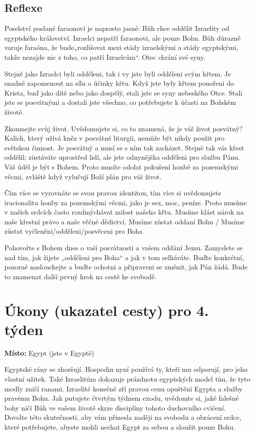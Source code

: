 \documentclass[11pt]{article}
\begin{document}
\subsection*{Reflexe}

Poselství poslané faraonovi je naprosto jasné: Bůh chce oddělit Izraelity od egyptského království. Izraelci nepatří
faraonovi, ale pouze Bohu. Bůh důrazně varuje faraóna, že bude„rozlišovat mezi stády izraelskými a stády
egyptskými, takže nezajde nic z toho, co patří Izraelcům“. Otec chrání své syny.

Stejně jako Izraelci byli odděleni, tak i vy jste byli odděleni svým křtem. Je snadné zapomenout na sílu a účinky
křtu. Když jste byly křtem ponořeni do Krista, buď jako dítě nebo jako dospělý, stali jste se syny nebeského Otce.
Stali jste se posvátnými a dostali jste všechno, co potřebujete k účasti na Božském životě.

Zkoumejte svůj život. Uvědomujete si, co to znamená, že je váš život posvátný? Kalich, který užívá kněz v
posvátné liturgii, nemůže být nikdy použit pro světskou činnost. Je posvátný a musí se s ním tak zacházet. Stejně
tak vás křest oddělil; zůstáváte uprostřed lidí, ale jste odnynějška odděleni pro službu Pánu. Váš úděl je být s
Bohem. Proto musíte odolat pokušení honbě za pozemskými věcmi, zvláště když vylučují Boží plán pro váš život.

Čím více se vyrovnáte se svou pravou identitou, tím více si uvědomujete iracionalitu honby za pozemskými věcmi,
jako je sex, moc, peníze. Proto musíme v našich srdcích často rozdmýchávat milost našeho křtu. Musíme klást
nárok na naše křestní právo a naše věčné dědictví. Musíme zůstat oddaní Bohu / Musíme zůstat
vyčleněni/odděleni/posvěceni pro Boha

Pohovořte s Bohem dnes o vaší posvátnosti a vašem oddání Jemu. Zamyslete se nad tím, jak žijete „odděleni pro
Boha“ a jak v tom selháváte. Buďte konkrétní, pozorně naslouchejte a buďte ochotni a připraveni se změnit, jak
Pán žádá. Bude to znamenat další pevný krok na cestě ke svobodě.

\newpage
\section*{Úkony (ukazatel cesty) pro 4. týden}

\textbf{Místo:} Egypt (jste v Egyptě)

Egyptské rány se zhoršují. Hospodin nyní používá ty, kteří mu odporují, pro jeho vlastní užitek. Také
Izraelitům dokazuje prázdnotu egyptských model tím, že tyto modly zničí ranami. Izraelité konečně zří
pravou cenu opuštění Egypta a služby pravému Bohu. Jak putujete čtvrtým týdnem exodu, uvědomte si,
jaké falešné bohy ničí Bůh ve vašem životě skrze disciplíny tohoto duchovního cvičení. Dovolte této
skutečnosti, aby vám přinesla naději na svobodu a obrácení srdce, které potřebujete, abyste mohli nechat
  Egypt za sebou a sloužit pouze Bohu.
\end{document}
